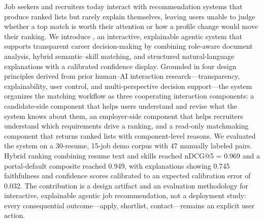 
Job seekers and recruiters today interact with recommendation systems that produce ranked lists but rarely explain themselves, leaving users unable to judge whether a top match is worth their attention or how a profile change would move their ranking.
We introduce \JobMatch, an interactive, explainable agentic system that supports transparent career decision-making by combining role-aware document analysis, hybrid semantic--skill matching, and structured natural-language explanations with a calibrated confidence display.
Grounded in four design principles derived from prior human--{AI} interaction research---transparency, explainability, user control, and multi-perspective decision support---the system organizes the matching workflow as three cooperating interaction components: a candidate-side component that helps users understand and revise what the system knows about them, an employer-side component that helps recruiters understand which requirements drive a ranking, and a read-only matchmaking component that returns ranked lists with component-level reasons.
We evaluated the system on a 30-resume, 15-job demo corpus with 47 manually labeled pairs.
Hybrid ranking combining resume text and skills reached nDCG@5 = 0.969 and a portal-default composite reached 0.949, with explanations showing 0.745 faithfulness and confidence scores calibrated to an expected calibration error of 0.032.
The contribution is a design artifact and an evaluation methodology for interactive, explainable agentic job recommendation, not a deployment study: every consequential outcome---apply, shortlist, contact---remains an explicit user action.
